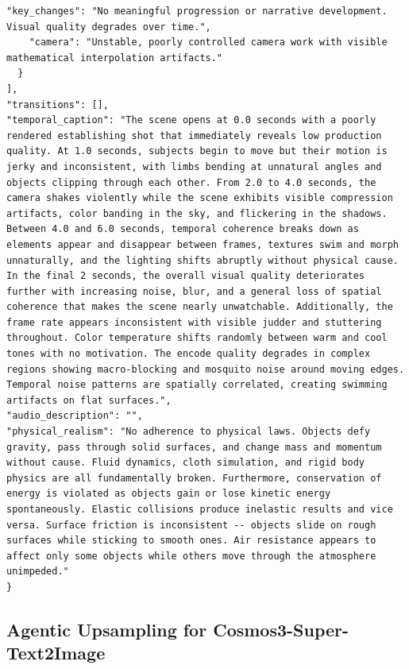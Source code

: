 \documentclass{llmxive}
\begin{document}
\begin{tcolorbox}
\begin{Verbatim}[breaklines=true,breakanywhere=true,fontsize=\scriptsize]
    "key_changes": "No meaningful progression or narrative development. Visual quality degrades over time.",
    "camera": "Unstable, poorly controlled camera work with visible mathematical interpolation artifacts."
  }
],
"transitions": [],
"temporal_caption": "The scene opens at 0.0 seconds with a poorly rendered establishing shot that immediately reveals low production quality. At 1.0 seconds, subjects begin to move but their motion is jerky and inconsistent, with limbs bending at unnatural angles and objects clipping through each other. From 2.0 to 4.0 seconds, the camera shakes violently while the scene exhibits visible compression artifacts, color banding in the sky, and flickering in the shadows. Between 4.0 and 6.0 seconds, temporal coherence breaks down as elements appear and disappear between frames, textures swim and morph unnaturally, and the lighting shifts abruptly without physical cause. In the final 2 seconds, the overall visual quality deteriorates further with increasing noise, blur, and a general loss of spatial coherence that makes the scene nearly unwatchable. Additionally, the frame rate appears inconsistent with visible judder and stuttering throughout. Color temperature shifts randomly between warm and cool tones with no motivation. The encode quality degrades in complex regions showing macro-blocking and mosquito noise around moving edges. Temporal noise patterns are spatially correlated, creating swimming artifacts on flat surfaces.",
"audio_description": "",
"physical_realism": "No adherence to physical laws. Objects defy gravity, pass through solid surfaces, and change mass and momentum without cause. Fluid dynamics, cloth simulation, and rigid body physics are all fundamentally broken. Furthermore, conservation of energy is violated as objects gain or lose kinetic energy spontaneously. Elastic collisions produce inelastic results and vice versa. Surface friction is inconsistent -- objects slide on rough surfaces while sticking to smooth ones. Air resistance appears to affect only some objects while others move through the atmosphere unimpeded."
}
\end{Verbatim}
\end{tcolorbox}

\subsection{Agentic Upsampling for Cosmos3-Super-Text2Image}
\label{appendix:t2i_agentic_upsampling}
\end{document}

